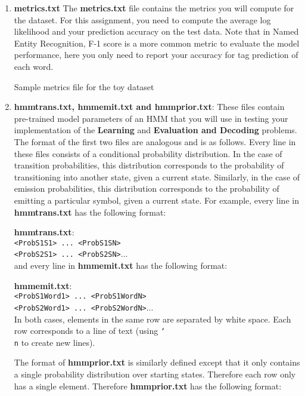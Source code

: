\documentclass{article}
\begin{document}
\begin{enumerate}
\item \textbf{metrics.txt} The \textbf{metrics.txt} file contains the metrics you will compute for the dataset. For this assignment, you need to compute the average log likelihood and your prediction accuracy on the test data. Note that in Named Entity Recognition, F-1 score is a more common metric to evaluate the model performance, here you only need to report your accuracy for tag prediction of each word. 

Sample metrics file for the toy dataset


\item \textbf{hmmtrans.txt, hmmemit.txt and hmmprior.txt}: These files contain pre-trained model parameters of an HMM that you will use in testing your implementation of the \textbf{Learning} and \textbf{Evaluation and Decoding} problems. The format of the first two files are analogous and is as follows. Every line in these files consists of a conditional probability distribution. In the case of transition probabilities, this distribution corresponds to the probability of transitioning into another state, given a current state. Similarly, in the case of emission probabilities, this distribution corresponds to the probability of emitting a particular symbol, given a current state. For example, every line in \textbf{hmmtrans.txt} has the following format:
    
    \textbf{hmmtrans.txt}:\\
    \texttt{<ProbS1S1> ... <ProbS1SN>}\\
     \texttt{<ProbS2S1> ... <ProbS2SN>}...\\   
    
and every line in \textbf{hmmemit.txt} has the following format:
    
    \textbf{hmmemit.txt}:\\
    \texttt{<ProbS1Word1> ... <ProbS1WordN>}\\
     \texttt{<ProbS2Word1> ... <ProbS2WordN>}...\\
    
In both cases, elements in the same row are separated by white space. Each row corresponds to a line of text (using \texttt{\char`\\ n} to create new lines).
    
    
The format of \textbf{hmmprior.txt} is similarly defined except that it only contains a single probability distribution over starting states. Therefore each row only has a single element. Therefore \textbf{hmmprior.txt} has the following format:
    

\end{enumerate}
\end{document}
